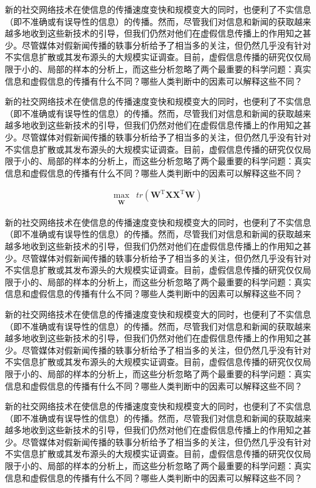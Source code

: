 \documentclass[a4paper,AutoFakeBold,oneside,12pt]{book}
\begin{document}
\begin{nopagenumber}
新的社交网络技术在使信息的传播速度变快和规模变大的同时，也便利了不实信息（即不准确或有误导性的信息）的传播。然而，尽管我们对信息和新闻的获取越来越多地收到这些新技术的引导，但我们仍然对他们在虚假信息传播上的作用知之甚少。尽管媒体对假新闻传播的轶事分析给予了相当多的关注，但仍然几乎没有针对不实信息扩散或其发布源头的大规模实证调查。目前，虚假信息传播的研究仅仅局限于小的、局部的样本的分析上，而这些分析忽略了两个最重要的科学问题：真实信息和虚假信息的传播有什么不同？哪些人类判断中的因素可以解释这些不同？

新的社交网络技术在使信息的传播速度变快和规模变大的同时，也便利了不实信息（即不准确或有误导性的信息）的传播。然而，尽管我们对信息和新闻的获取越来越多地收到这些新技术的引导，但我们仍然对他们在虚假信息传播上的作用知之甚少。尽管媒体对假新闻传播的轶事分析给予了相当多的关注，但仍然几乎没有针对不实信息扩散或其发布源头的大规模实证调查。目前，虚假信息传播的研究仅仅局限于小的、局部的样本的分析上，而这些分析忽略了两个最重要的科学问题：真实信息和虚假信息的传播有什么不同？哪些人类判断中的因素可以解释这些不同？

\begin{equation}
\label{PCA_goal_appx2}
\begin{aligned}
\max_{\substack{\bm{W}}}  &  tr(\bm{W}^\mathrm{T}\bm{X}\bm{X}^ \mathrm{T}\bm{W})
\end{aligned}
\end{equation}

新的社交网络技术在使信息的传播速度变快和规模变大的同时，也便利了不实信息（即不准确或有误导性的信息）的传播。然而，尽管我们对信息和新闻的获取越来越多地收到这些新技术的引导，但我们仍然对他们在虚假信息传播上的作用知之甚少。尽管媒体对假新闻传播的轶事分析给予了相当多的关注，但仍然几乎没有针对不实信息扩散或其发布源头的大规模实证调查。目前，虚假信息传播的研究仅仅局限于小的、局部的样本的分析上，而这些分析忽略了两个最重要的科学问题：真实信息和虚假信息的传播有什么不同？哪些人类判断中的因素可以解释这些不同？

新的社交网络技术在使信息的传播速度变快和规模变大的同时，也便利了不实信息（即不准确或有误导性的信息）的传播。然而，尽管我们对信息和新闻的获取越来越多地收到这些新技术的引导，但我们仍然对他们在虚假信息传播上的作用知之甚少。尽管媒体对假新闻传播的轶事分析给予了相当多的关注，但仍然几乎没有针对不实信息扩散或其发布源头的大规模实证调查。目前，虚假信息传播的研究仅仅局限于小的、局部的样本的分析上，而这些分析忽略了两个最重要的科学问题：真实信息和虚假信息的传播有什么不同？哪些人类判断中的因素可以解释这些不同？

新的社交网络技术在使信息的传播速度变快和规模变大的同时，也便利了不实信息（即不准确或有误导性的信息）的传播。然而，尽管我们对信息和新闻的获取越来越多地收到这些新技术的引导，但我们仍然对他们在虚假信息传播上的作用知之甚少。尽管媒体对假新闻传播的轶事分析给予了相当多的关注，但仍然几乎没有针对不实信息扩散或其发布源头的大规模实证调查。目前，虚假信息传播的研究仅仅局限于小的、局部的样本的分析上，而这些分析忽略了两个最重要的科学问题：真实信息和虚假信息的传播有什么不同？哪些人类判断中的因素可以解释这些不同？

\endgroup
\end{nopagenumber}

\blankmatter
 


\blankmatter
 
\end{document}
